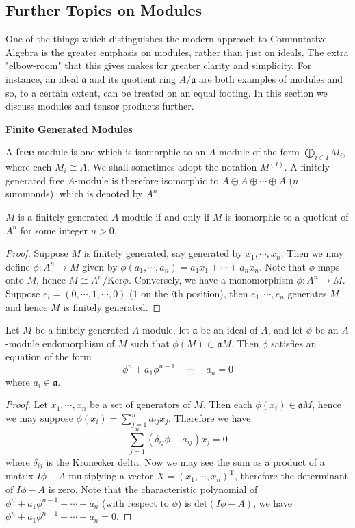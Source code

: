 \subsection{Further Topics on Modules}
One of the things which distinguishes the modern approach to Commutative Algebra is the greater emphasis on modules, rather than just on ideals. The extra "elbow-room" that this gives makes for greater clarity and simplicity. For instance, an ideal $\mathfrak{a}$ and its quotient ring $A/\mathfrak{a}$ are both examples of modules and so, to a certain extent, can be treated on an equal footing. In this section we discuss modules and tensor products further.
\begin{center}
\begin{large}
    \textbf{Finite Generated Modules}
\end{large}
\end{center}
A \textbf{free} module is one which is isomorphic to an $A$-module of the form $\bigoplus_{i\in I}M_i$, where each $M_i\cong A$. We shall sometimes adopt the notation $M^{(I)}$. A finitely generated free $A$-module is therefore isomorphic to $A\oplus A\oplus\cdots\oplus A$ ($n$ summonds), which is denoted by $A^n$.\par
\begin{proposition}
$M$ is a finitely generated $A$-module if and only if $M$ is isomorphic to a quotient of $A^n$ for some integer $n>0$.
\end{proposition}
\begin{proof}
Suppose $M$ is finitely generated, say generated by $x_1,\cdots,x_n$. Then we may define $\phi:A^n\to M$ given by $\phi(a_1,\cdots,a_n)=a_1x_1+\cdots+a_nx_n$. Note that $\phi$ maps onto $M$, hence $M\cong A^n/\mathrm{Ker}\phi$. Conversely, we have a monomorphism $\phi:A^n\to M$. Suppose $e_i=(0,\cdots,1,\cdots,0)$ ($1$ on the $i$th position), then $e_1,\cdots,e_n$ generates $M$ and hence $M$ is finitely generated.
\end{proof}
\begin{proposition}
Let $M$ be a finitely generated $A$-module, let $\mathfrak{a}$ be an ideal of $A$, and let $\phi$ be an $A$-module endomorphism of $M$ such that $\phi(M)\subset\mathfrak{a}M$. Then $\phi$ satisfies an equation of the form 
$$\phi^n+a_1\phi^{n-1}+\cdots+a_n=0$$
where $a_i\in\mathfrak{a}$.
\end{proposition}
\begin{proof}
Let $x_1,\cdots,x_n$ be a set of generators of $M$. Then each $\phi(x_i)\in \mathfrak{a}M$, hence we may suppose $\phi(x_i)=\sum_{j=1}^na_{ij}x_j$. Therefore we have 
$$\sum_{j=1}^n(\delta_{ij}\phi-a_{ij})x_j=0$$
where $\delta_{ij}$ is the Kronecker delta. Now we may see the sum as a product of a matrix $I\phi-A$ multiplying a vector $X=(x_1,\cdots,x_n)^\mathrm{T}$, therefore the determinant of $I\phi-A$ is zero. Note that the characteristic polynomial of $\phi^n+a_{1}\phi^{n-1}+\cdots+a_{n}$ (with respect to $\phi$) is $\mathrm{det}(I\phi-A)$, we have $\phi^n+a_1\phi^{n-1}+\cdots+a_n=0$.
\end{proof}
